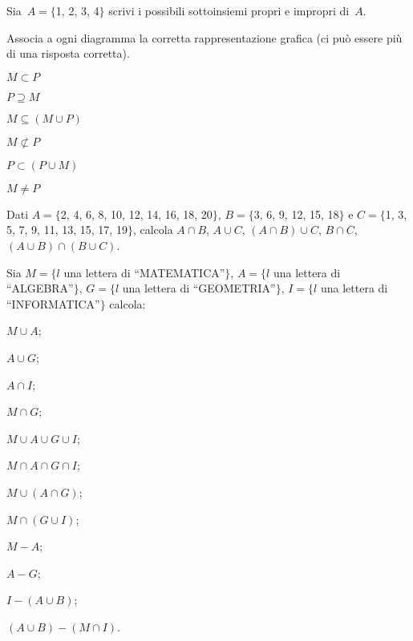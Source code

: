 \begin{esercizio}
\label{ese:\thechapter.96}
Sia~$A=\{$1, 2, 3, 4$\}$ scrivi i possibili sottoinsiemi propri e impropri di~$A$.
\end{esercizio}
\pagebreak
\begin{esercizio}
\label{ese:\thechapter.97}
Associa a ogni diagramma la corretta rappresentazione grafica (ci può essere più di una risposta corretta).

\TabPositions{5cm}
\begin{enumeratea}
 \item $M\subset P$ \tab\boxA\quad\boxB\quad\boxC\quad\boxD\quad\boxE
\item $P\supseteq M$ \tab\boxA\quad\boxB\quad\boxC\quad\boxD\quad\boxE
\item $M\subseteq (M\cup P)$ \tab\boxA\quad\boxB\quad\boxC\quad\boxD\quad\boxE
\item $M\not\subset P$ \tab\boxA\quad\boxB\quad\boxC\quad\boxD\quad\boxE
\item $P\subset (P\cup M)$ \tab\boxA\quad\boxB\quad\boxC\quad\boxD\quad\boxE
\item $M\neq P$ \tab\boxA\quad\boxB\quad\boxC\quad\boxD\quad\boxE
\end{enumeratea}
\begin{center}

\end{center}
\end{esercizio}

\begin{esercizio}
\label{ese:\thechapter.98}
Dati $A=\{$2, 4, 6, 8, 10, 12, 14, 16, 18, 20$\}$, $B=\{$3, 6, 9, 12, 15, 18$\}$ e
$C=\{$1, 3, 5, 7, 9, 11, 13, 15, 17, 19$\}$, calcola
$A\cap B$, $A\cup C$, $(A\cap B)\cup C$, $B\cap C$, $(A\cup B)\cap(B\cup C)$.
\end{esercizio}

\begin{esercizio}
\label{ese:\thechapter.99}
Sia $M=\{l$ una lettera di ``MATEMATICA''$\}$, $A=\{l$ una lettera di ``ALGEBRA''$\}$, $G=\{l$ una lettera di ``GEOMETRIA''$\}$, $I=\{l$ una lettera di ``INFORMATICA''$\}$ calcola:
\begin{multicols}{3}
\begin{enumeratea}
 \item $M\cup A$;
 \item $A\cup G$;
 \item $A\cap I$;
 \item $M\cap G$;
 \item $M\cup A \cup G \cup I$;
 \item $M\cap A \cap G \cap I$;
 \item $M\cup (A\cap G)$;
 \item $M\cap (G\cup I)$;
 \item $M-A$;
 \item $A-G$;
 \item $I-(A\cup B)$;
 \item $(A\cup B)-(M\cap I)$.
\end{enumeratea}
\end{multicols}
\end{esercizio}

